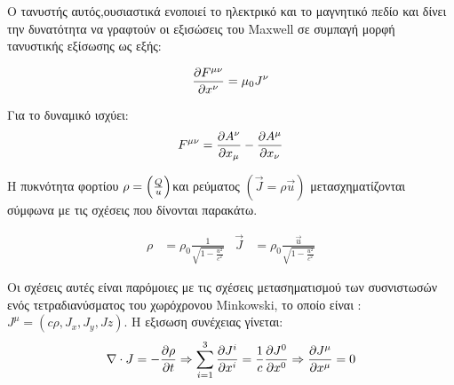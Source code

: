 Ο τανυστής αυτός,ουσιαστικά ενοποιεί το ηλεκτρικό και το μαγνητικό πεδίο και δίνει την δυνατότητα να γραφτούν οι εξισώσεις του \textlatin{Maxwell} σε συμπαγή μορφή τανυστικής εξίσωσης ως εξής: 

\begin{equation}
  \frac{\partial F^{\mu \nu}}{\partial x^{\nu}}=\mu_0 J^{\nu}
  \label {contineq2}
\end{equation}

Για το δυναμικό ισχύει: 
\[
  F^{\mu \nu}=\frac{\partial A^\nu}{\partial x_{\mu}}-\frac{\partial A^\mu}{\partial x_{\nu}}
\]

Η πυκνότητα φορτίου $\rho = \left(  \frac{Q}{u} \right) $και ρεύματος $(\vec{J}=\rho \vec{u}) $ μετασχηματίζονται σύμφωνα με τις σχέσεις που δίνονται παρακάτω. 

\begin{align}
  \rho &=\rho_0\frac{1}{\sqrt{1-\frac{u^2}{c^2}}}  & \vec{J}& =\rho_0\frac{\vec{u}}{\sqrt{1-\frac{u^2}{c^2}}}
\end{align}

Οι σχέσεις αυτές είναι παρόμοιες με τις σχέσεις μετασηματισμού των συσνιστωσών ενός τετραδιανύσματος του χωρόχρονου \textlatin{Minkowski}, το οποίο είναι : $J^{\mu}=(c\rho,J_x,J_y,Jz)$. 
Η εξισωση συνέχειας γίνεται: 
\begin{equation}
  \nabla \cdot J = -\frac{\partial \rho}{\partial t} \Rightarrow \sum\limits_{i=1}^3 \frac{\partial J^i}{\partial x^i}=\frac{1}{c}\frac{\partial J^0}{\partial x^0} \Rightarrow \frac{\partial J^{\mu}}{\partial x^{\mu}}=0
  \label{contineq}
\end{equation}

  
